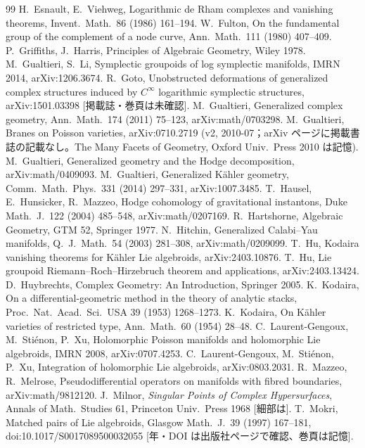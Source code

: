 \begin{thebibliography}{99}
 H.\ Esnault, E.\ Viehweg, Logarithmic de Rham complexes and vanishing theorems, Invent.\ Math.\ 86 (1986) 161--194.
 W.\ Fulton, On the fundamental group of the complement of a node curve, Ann.\ Math.\ 111 (1980) 407--409.
 P.\ Griffiths, J.\ Harris, Principles of Algebraic Geometry, Wiley 1978.
 M.\ Gualtieri, S.\ Li, Symplectic groupoids of log symplectic manifolds, IMRN 2014, arXiv:1206.3674.
 R.\ Goto, Unobstructed deformations of generalized complex structures induced by $C^\infty$ logarithmic symplectic structures, arXiv:1501.03398 [掲載誌・巻頁は未確認\tQ].
 M.\ Gualtieri, Generalized complex geometry, Ann.\ Math.\ 174 (2011) 75--123, arXiv:math/0703298.
 M.\ Gualtieri, Branes on Poisson varieties, arXiv:0710.2719 (v2, 2010-07；arXiv ページに掲載書誌の記載なし。The Many Facets of Geometry, Oxford Univ.\ Press 2010 は記憶\tQ).
 M.\ Gualtieri, Generalized geometry and the Hodge decomposition, arXiv:math/0409093.
 M.\ Gualtieri, Generalized K\"ahler geometry, Comm.\ Math.\ Phys.\ 331 (2014) 297--331, arXiv:1007.3485.
 T.\ Hausel, E.\ Hunsicker, R.\ Mazzeo, Hodge cohomology of gravitational instantons, Duke Math.\ J.\ 122 (2004) 485--548, arXiv:math/0207169.
 R.\ Hartshorne, Algebraic Geometry, GTM 52, Springer 1977.
 N.\ Hitchin, Generalized Calabi--Yau manifolds, Q.\ J.\ Math.\ 54 (2003) 281--308, arXiv:math/0209099.
 T.\ Hu, Kodaira vanishing theorems for K\"ahler Lie algebroids, arXiv:2403.10876.
 T.\ Hu, Lie groupoid Riemann--Roch--Hirzebruch theorem and applications, arXiv:2403.13424.
 D.\ Huybrechts, Complex Geometry: An Introduction, Springer 2005.
 K.\ Kodaira, On a differential-geometric method in the theory of analytic stacks, Proc.\ Nat.\ Acad.\ Sci.\ USA 39 (1953) 1268--1273.
 K.\ Kodaira, On K\"ahler varieties of restricted type, Ann.\ Math.\ 60 (1954) 28--48.
 C.\ Laurent-Gengoux, M.\ Sti\'enon, P.\ Xu, Holomorphic Poisson manifolds and holomorphic Lie algebroids, IMRN 2008, arXiv:0707.4253.
 C.\ Laurent-Gengoux, M.\ Sti\'enon, P.\ Xu, Integration of holomorphic Lie algebroids, arXiv:0803.2031.
 R.\ Mazzeo, R.\ Melrose, Pseudodifferential operators on manifolds with fibred boundaries, arXiv:math/9812120.
 J.\ Milnor, \emph{Singular Points of Complex Hypersurfaces}, Annals of Math.\ Studies 61, Princeton Univ.\ Press 1968 [細部は\tQ].
 T.\ Mokri, Matched pairs of Lie algebroids, Glasgow Math.\ J.\ 39 (1997) 167--181, doi:10.1017/S0017089500032055 [年・DOI は出版社ページで確認、巻頁は記憶\tQ].

\end{thebibliography}
